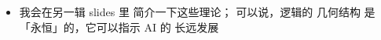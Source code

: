 \documentclass[16pt]{beamer}
\newcommand{\cc}[2]{#1}
\newcommand{\cc}[2]{#2}
\begin{document}
\begin{frame}[fragile]
\begin{itemize}
	
	
	\item \cc{我会在另一辑 slides 里 简介一下这些理论； 可以说，逻辑的 几何结构 是「永恒」的，它可以指示 AI 的 长远发展}
	{In another article we shall explore this connection.  One could say the mathematical structure of logic is ``eternal'';  It will provide guidance for the long-term development of AI}
	
\end{itemize}
\end{frame}
\end{document}
